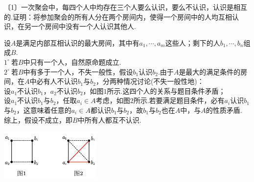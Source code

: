 \documentclass[lang=cn, zihao=4.5]{elegantbook}
\newcommand{\nd}[1]{〔#1〕}
\newcommand{\buzhou}[1]{$#1^{\circ} \ $}
\begin{document}
\begin{example} %
	\nd{1}一次聚会中，每四个人中均存在三个人要么认识，要么不认识，认识是相互的.证明：将参加聚会的所有人分在两个房间内，使得一个房间中的人均互相认识，在另一个房间中没有一个人认识其他人.
\end{example}
\begin{solution}
	设$A$是满足内部互相认识的最大房间，其中有$a_1, \cdots ,a_m$这些人；剩下的人$b_1, \cdots ,b_n$组成$B$. \\
	\buzhou{1}若$B$中只有一个人，自然原命题成立. \\
	\buzhou{2}若$B$中有多于一个人，不失一般性，假设$b_1$认识$b_2$.由于$A$是最大的满足条件的房间，在$A$中必有人不认识$b_1$与$b_2$，分两种情况讨论(不失一般性地)： \\
	设$a_1$不认识$b_1$，$a_2$不认识$b_2$，如图$1$所示.这四个人的关系与题目条件矛盾； \\
	设$a_1$不认识$b_1$与$b_2$，任取$a_i \in A$考虑，如图$2$所示.若要满足题目条件，必有$a_i$认识$b_1$与$b_2$，这意味着任意的$a_i \in A$都认识$b_1$与$b_2$，故$b_1$与$b_2$也在$A$中，与$A$的性质矛盾. \\
	综上，假设不成立，即$B$中所有人都互不认识.
	\begin{center}
		\includegraphics[width=5cm]{attachment/202302073.pdf}
	\end{center}
\end{solution}
\end{document}
